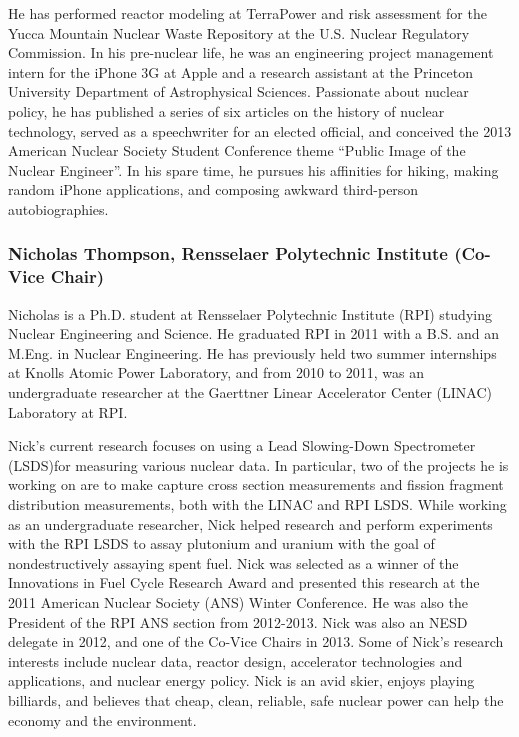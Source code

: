 He has performed reactor modeling at TerraPower and risk assessment for the
Yucca Mountain Nuclear Waste Repository at the U.S. Nuclear Regulatory
Commission. In his pre-nuclear life, he was an engineering project management
intern for the iPhone 3G at Apple and a research assistant at the Princeton
University Department of Astrophysical Sciences. Passionate about nuclear
policy, he has published a series of six articles on the history of nuclear
technology, served as a speechwriter for an elected official, and conceived the
2013 American Nuclear Society Student Conference theme ``Public Image of the
Nuclear Engineer''. In his spare time, he pursues his affinities for hiking,
making random iPhone applications, and composing awkward third-person
autobiographies.

\subsubsection*{Nicholas Thompson, Rensselaer Polytechnic Institute (Co-Vice Chair)}

Nicholas is a Ph.D. student at Rensselaer Polytechnic Institute (RPI) studying
Nuclear Engineering and Science. He graduated RPI in 2011 with a B.S. and an
M.Eng. in Nuclear Engineering. He has previously held two summer internships at
Knolls Atomic Power Laboratory, and from 2010 to 2011, was an undergraduate
researcher at the Gaerttner Linear Accelerator Center (LINAC) Laboratory at RPI.

Nick's current research focuses on using a Lead Slowing-Down Spectrometer
(LSDS)for measuring various nuclear data. In particular, two of the projects he
is working on are to make capture cross section measurements and fission
fragment distribution measurements, both with the LINAC and RPI LSDS. While
working as an undergraduate researcher, Nick helped research and perform
experiments with the RPI LSDS to assay plutonium and uranium with the goal of
nondestructively assaying spent fuel. Nick was selected as a winner of the
Innovations in Fuel Cycle Research Award and presented this research at the 2011
American Nuclear Society (ANS) Winter Conference. He was also the President of
the RPI ANS section from 2012-2013. Nick was also an NESD delegate in 2012, and
one of the Co-Vice Chairs in 2013. Some of Nick's research interests include
nuclear data, reactor design, accelerator technologies and applications, and
nuclear energy policy. Nick is an avid skier, enjoys playing billiards, and
believes that cheap, clean, reliable, safe nuclear power can help the economy
and the environment.

